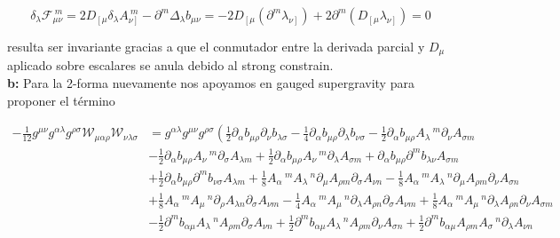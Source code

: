 \documentclass{article}
\numberwithin{equation}{section}
\begin{document}
\begin{equation}
\delta_{\lambda} \mathcal{F}_{\mu \nu}^{\ m} = 2 D_{\left[\mu \right.} \delta_{\lambda} A_{\left.\nu \right]}^{\ m } - \partial^m \Delta_{\lambda} b_{\mu \nu} = -2 D_{\left[\mu \right.} \left(\partial^m \lambda_{\left.\nu \right]}\right) + 2 \partial^m \left(D_{\left[\mu \right.}  \lambda_{\left.\nu \right]} \right) = 0 
\end{equation}

resulta ser invariante gracias a que el conmutador entre la derivada parcial y $ D_{\mu} $ aplicado sobre escalares se anula debido al strong constrain.\\

\textbf{b:} Para la 2-forma nuevamente nos apoyamos en gauged supergravity para proponer el término

\begin{equation}\label{WW}
\begin{aligned}
- \frac{1}{12} g^{\mu \nu} g^{\alpha \lambda} g^{\rho \sigma} \mathcal{W}_{\mu \alpha \rho} \mathcal{W}_{\nu \lambda \sigma} &=
g^{\alpha \lambda} g^{\mu \nu} g^{\rho \sigma} \left( \frac{1}{2} \partial_{\alpha}b_{\mu \rho} \partial_{\nu}b_{\lambda \sigma} - \frac{1}{4}\partial_{\alpha}b_{\mu \rho} \partial_{\lambda}b_{\nu \sigma} - \frac{1}{2}\partial_{\alpha}b_{\mu \rho} A_{\lambda}\,^{m} \partial_{\nu}A_{\sigma m} \right.\\
&- \frac{1}{2}\partial_{\alpha}b_{\mu \rho} A_{\nu}\,^{m} \partial_{\sigma}A_{\lambda m}+\frac{1}{2}\partial_{\alpha}b_{\mu \rho} A_{\nu}\,^{m} \partial_{\lambda}A_{\sigma m}+\partial_{\alpha}b_{\mu \rho} \partial^{m}b_{\lambda \nu} A_{\sigma m}\\
&+\frac{1}{2}\partial_{\alpha}b_{\mu \rho} \partial^{m}b_{\nu \sigma} A_{\lambda m}+\frac{1}{8}A_{\alpha}\,^{m} A_{\lambda}\,^{n} \partial_{\mu}A_{\rho m} \partial_{\sigma}A_{\nu n} - \frac{1}{8}A_{\alpha}\,^{m} A_{\lambda}\,^{n} \partial_{\mu}A_{\rho m} \partial_{\nu}A_{\sigma n}\\
&+\frac{1}{8}A_{\alpha}\,^{m} A_{\mu}\,^{n} \partial_{\rho}A_{\lambda n} \partial_{\sigma}A_{\nu m} - \frac{1}{4}A_{\alpha}\,^{m} A_{\mu}\,^{n} \partial_{\lambda}A_{\rho n} \partial_{\sigma}A_{\nu m}+\frac{1}{8}A_{\alpha}\,^{m} A_{\mu}\,^{n} \partial_{\lambda}A_{\rho n} \partial_{\nu}A_{\sigma m}\\
&- \frac{1}{2}\partial^{m}b_{\alpha \mu} A_{\lambda}\,^{n} A_{\rho m} \partial_{\sigma}A_{\nu n}+\frac{1}{2}\partial^{m}b_{\alpha \mu} A_{\lambda}\,^{n} A_{\rho m} \partial_{\nu}A_{\sigma n}+\frac{1}{2}\partial^{m}b_{\alpha \mu} A_{\rho m} A_{\sigma}\,^{n} \partial_{\lambda}A_{\nu n}\\

\end{aligned}
\end{equation}
\end{document}
